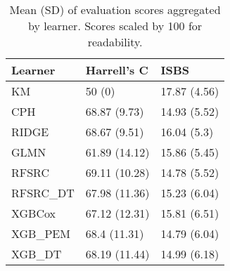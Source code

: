 \begin{table}
\centering
\caption{Mean (SD) of evaluation scores aggregated by learner. Scores scaled by 100 for readability.\label{tab:bm-aggr}}
\centering
\begin{tabular}[t]{lll}
\toprule
Learner & Harrell's C & ISBS\\
\midrule
KM & 50 (0) & 17.87 (4.56)\\
CPH & 68.87 (9.73) & 14.93 (5.52)\\
RIDGE & 68.67 (9.51) & 16.04 (5.3)\\
GLMN & 61.89 (14.12) & 15.86 (5.45)\\
RFSRC & 69.11 (10.28) & 14.78 (5.52)\\
RFSRC\_DT & 67.98 (11.36) & 15.23 (6.04)\\
XGBCox & 67.12 (12.31) & 15.81 (6.51)\\
XGB\_PEM & 68.4 (11.31) & 14.79 (6.04)\\
XGB\_DT & 68.19 (11.44) & 14.99 (6.18)\\
\bottomrule
\end{tabular}
\end{table}
